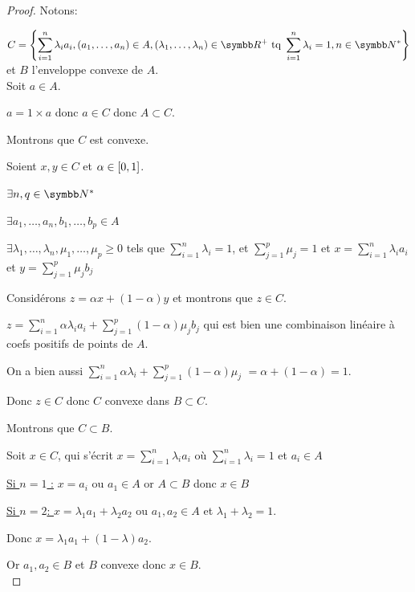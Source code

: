 \begin{proof}
    Notons:
    
    $\displaystyle C = \left\{\sum_{i = 1}^n \lambda_i a_i, (a_1, \dots, a_n) \in A, (\lambda_1, \dots, \lambda_n) \in \R^+ \text{ tq } \sum_{i = 1}^n \lambda_i = 1, n \in \N^*\right\}$
    et $B$ l'enveloppe convexe de $A$. \\

    Soit $a \in A$. 

    $a = 1 \times a$ donc $a \in C$ donc $A \subset C$. 

    Montrons que $C$ est convexe. 

    Soient $x, y \in C$ et $\alpha \in \left[0, 1\right]$. 

    $\exists n, q \in \N^*$

    $\exists a_1, \dots, a_n, b_1, \dots, b_p \in A$

    $\exists \lambda_1, \dots, \lambda_n, \mu_1, \dots, \mu_p \geqslant 0$ tels que 
    $\displaystyle \sum_{i = 1}^{n} \lambda_i = 1$, et $\displaystyle \sum_{j = 1}^{p} \mu_j = 1$ et 
    $\displaystyle x = \sum_{i = 1}^{n }\lambda_i a_i$ et $\displaystyle y = \sum_{j = 1}^{p } \mu_j b_j$

    Considérons $z = \alpha x + (1 - \alpha)y$ et montrons que $z \in C$. 

    $\displaystyle z = \sum_{i = 1}^{n} \alpha \lambda_i a_i + \sum_{j = 1}^{p } (1 - \alpha) \mu_j b_j$
    qui est bien une combinaison linéaire à coefs positifs de points de $A$. 

    On a bien aussi $\displaystyle \sum_{i = 1}^{n } \alpha \lambda_i + \sum_{j = 1}^{p } (1 - \alpha) \mu_j$
    $ = \alpha + (1 - \alpha) = 1$. 

    Donc $z \in C$ donc $C$ convexe dans $B \subset C$. 

    Montrons que $C \subset B$. 

    Soit $x \in C$, qui s'écrit $\displaystyle x = \sum_{ i = 1}^{n }\lambda_i a_i$ où 
    $\displaystyle \sum_{i = 1}^{n } \lambda_i = 1$ et $a_i \in A$

    \underline{Si $n = 1$ :} $x = a_i$ ou $a_1 \in A$
    or $A \subset B$ donc $x \in B$

    \underline{Si $n = 2$: } $x = \lambda_1 a_1 + \lambda_2 a_2$ ou $a_1, a_2 \in A$ et 
    $\lambda_1 + \lambda_2 = 1$. 

    Donc $x = \lambda_1 a_1 + (1 - \lambda)a_2$. 

    Or $a_1, a_2 \in B$ et $B$ convexe donc $x \in B$. \\


\end{proof}
